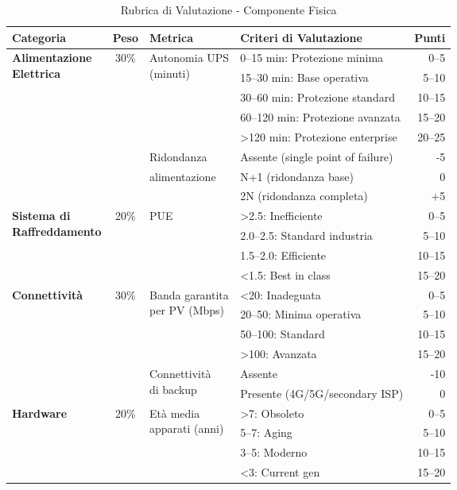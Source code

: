 \begin{table}[H]
\centering
\caption{Rubrica di Valutazione - Componente Fisica}
\label{tab:rubrica-fisica}
\small
\begin{tabularx}{\textwidth}{l c l X r}
\toprule
\textbf{Categoria} & \textbf{Peso} & \textbf{Metrica} & \textbf{Criteri di Valutazione} & \textbf{Punti} \\
\midrule
\multirow{5}{*}{\parbox{2.5cm}{\textbf{Alimentazione\\Elettrica}}} 
& \multirow{5}{*}{30\%} 
& \multirow{5}{*}{\parbox{2.5cm}{Autonomia UPS\\(minuti)}} 
& 0--15 min: Protezione minima & 0--5 \\
& & & 15--30 min: Base operativa & 5--10 \\
& & & 30--60 min: Protezione standard & 10--15 \\
& & & 60--120 min: Protezione avanzata & 15--20 \\
& & & >120 min: Protezione enterprise & 20--25 \\
\cmidrule{3-5}
& & Ridondanza & Assente (single point of failure) & -5 \\
& & alimentazione & N+1 (ridondanza base) & 0 \\
& & & 2N (ridondanza completa) & +5 \\
\midrule
\multirow{4}{*}{\parbox{2.5cm}{\textbf{Sistema di\\Raffreddamento}}} 
& \multirow{4}{*}{20\%} 
& \multirow{4}{*}{PUE\footnotemark} 
& >2.5: Inefficiente & 0--5 \\
& & & 2.0--2.5: Standard industria & 5--10 \\
& & & 1.5--2.0: Efficiente & 10--15 \\
& & & <1.5: Best in class & 15--20 \\
\midrule
\multirow{6}{*}{\textbf{Connettività}} 
& \multirow{6}{*}{30\%} 
& \multirow{3}{*}{\parbox{2.5cm}{Banda garantita\\per PV (Mbps)}} 
& <20: Inadeguata & 0--5 \\
& & & 20--50: Minima operativa & 5--10 \\
& & & 50--100: Standard & 10--15 \\
& & & >100: Avanzata & 15--20 \\
\cmidrule{3-5}
& & \multirow{2}{*}{\parbox{2.5cm}{Connettività\\di backup}} 
& Assente & -10 \\
& & & Presente (4G/5G/secondary ISP) & 0 \\
\midrule
\multirow{4}{*}{\textbf{Hardware}} 
& \multirow{4}{*}{20\%} 
& \multirow{4}{*}{\parbox{2.5cm}{Età media\\apparati (anni)}} 
& >7: Obsoleto & 0--5 \\
& & & 5--7: Aging & 5--10 \\
& & & 3--5: Moderno & 10--15 \\
& & & <3: Current gen & 15--20 \\
\bottomrule
\end{tabularx}
\end{table}

